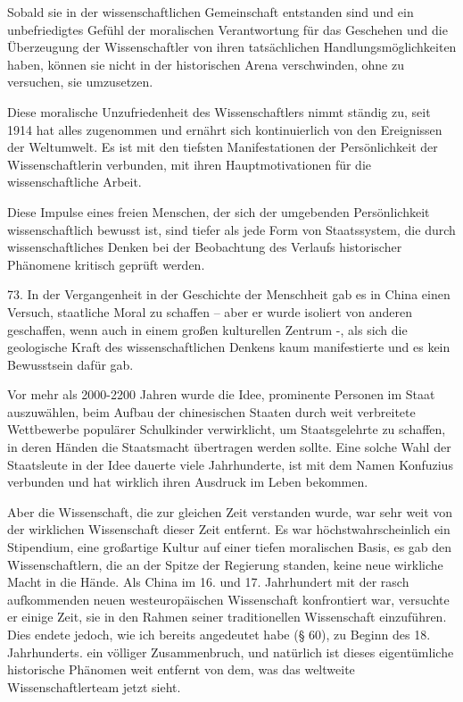\documentclass[11pt,a4paper]{book}
\begin{document}
Sobald sie in der wissenschaftlichen Gemeinschaft entstanden sind und ein unbefriedigtes Gefühl der moralischen Verantwortung für das Geschehen und die Überzeugung der Wissenschaftler von ihren tatsächlichen Handlungsmöglichkeiten haben, können sie nicht in der historischen Arena verschwinden, ohne zu versuchen, sie umzusetzen.



Diese moralische Unzufriedenheit des Wissenschaftlers nimmt ständig zu, seit 1914 hat alles zugenommen und ernährt sich kontinuierlich von den Ereignissen der Weltumwelt. Es ist mit den tiefsten Manifestationen der Persönlichkeit der Wissenschaftlerin verbunden, mit ihren Hauptmotivationen für die wissenschaftliche Arbeit.



Diese Impulse eines freien Menschen, der sich der umgebenden Persönlichkeit wissenschaftlich bewusst ist, sind tiefer als jede Form von Staatssystem, die durch wissenschaftliches Denken bei der Beobachtung des Verlaufs historischer Phänomene kritisch geprüft werden.



73. In der Vergangenheit in der Geschichte der Menschheit gab es in China einen Versuch, staatliche Moral zu schaffen -- aber er wurde isoliert von anderen geschaffen, wenn auch in einem großen kulturellen Zentrum -, als sich die geologische Kraft des wissenschaftlichen Denkens kaum manifestierte und es kein Bewusstsein dafür gab.



Vor mehr als 2000-2200 Jahren wurde die Idee, prominente Personen im Staat auszuwählen, beim Aufbau der chinesischen Staaten durch weit verbreitete Wettbewerbe populärer Schulkinder verwirklicht, um Staatsgelehrte zu schaffen, in deren Händen die Staatsmacht übertragen werden sollte. Eine solche Wahl der Staatsleute in der Idee dauerte viele Jahrhunderte, ist mit dem Namen Konfuzius verbunden und hat wirklich ihren Ausdruck im Leben bekommen.



Aber die Wissenschaft, die zur gleichen Zeit verstanden wurde, war sehr weit von der wirklichen Wissenschaft dieser Zeit entfernt. Es war höchstwahrscheinlich ein Stipendium, eine großartige Kultur auf einer tiefen moralischen Basis, es gab den Wissenschaftlern, die an der Spitze der Regierung standen, keine neue wirkliche Macht in die Hände. Als China im 16. und 17. Jahrhundert mit der rasch aufkommenden neuen westeuropäischen Wissenschaft konfrontiert war, versuchte er einige Zeit, sie in den Rahmen seiner traditionellen Wissenschaft einzuführen. Dies endete jedoch, wie ich bereits angedeutet habe (§ 60), zu Beginn des 18. Jahrhunderts. ein völliger Zusammenbruch, und natürlich ist dieses eigentümliche historische Phänomen weit entfernt von dem, was das weltweite Wissenschaftlerteam jetzt sieht.
\end{document}
